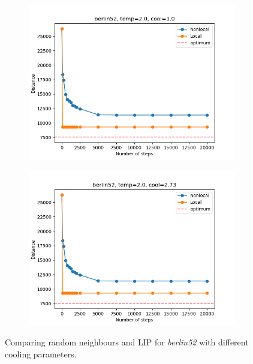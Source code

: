 \begin{figure}[!htb]
	\centering
	\begin{subfigure}{0.45\textwidth}
		\includegraphics[width=\textwidth]{img/berlin52_temp=2.0_cool=1.0}
	\end{subfigure}
	\begin{subfigure}{0.45\textwidth}
		\includegraphics[width=\textwidth]{img/berlin52_temp=2.0_cool=2.73}
	\end{subfigure}
	\caption{Comparing random neighbours and LIP for \textit{berlin52} with different cooling parameters.}
	\label{fig:berlin52_comp}
\end{figure}
	
